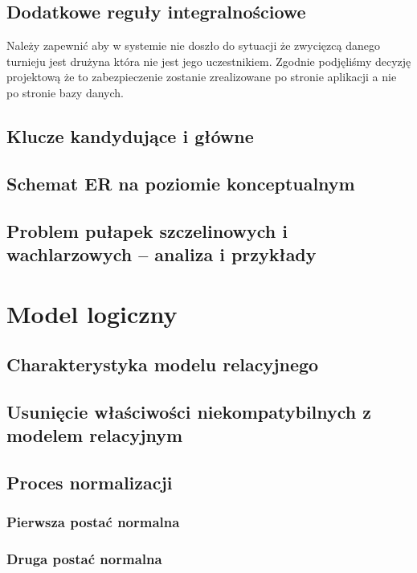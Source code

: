 \documentclass{mwrep}[15pt]
\begin{document}
\section{Dodatkowe reguły integralnościowe}

Należy zapewnić aby w systemie nie doszło do sytuacji że zwycięzcą danego turnieju jest drużyna która nie jest jego uczestnikiem.
Zgodnie podjęliśmy decyzję projektową że to zabezpieczenie zostanie zrealizowane po stronie aplikacji a nie po stronie bazy danych.

\section{Klucze kandydujące i główne}



\section{Schemat ER na poziomie konceptualnym}

\section{Problem pułapek szczelinowych i wachlarzowych – analiza i przykłady}



\chapter{Model logiczny}

\section{Charakterystyka modelu relacyjnego}

\section{Usunięcie właściwości niekompatybilnych z modelem relacyjnym}

\section{Proces normalizacji}

\subsection{Pierwsza postać normalna}
\subsection{Druga postać normalna}
\end{document}
